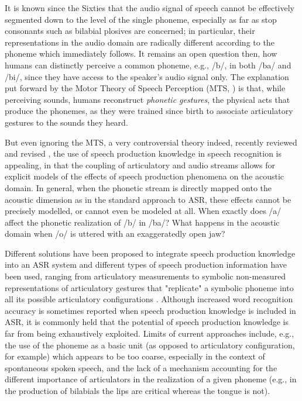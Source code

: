 It is known since the Sixties \cite{liberman1} that the audio signal of speech
cannot be effectively segmented down to the level of the single phoneme,
especially as far as stop consonants such as bilabial plosives
are concerned; in particular, their representations in the audio domain are
radically different according to the phoneme which immediately follows.
It remains an open question then, how humans can distinctly perceive a common
phoneme, e.g., /b/, in both /ba/ and /bi/, since they have access to the speaker's
audio signal only. The explanation put forward by the Motor Theory of Speech Perception
(MTS, \cite{liberman2}) is that, while perceiving sounds, humans reconstruct
\emph{phonetic gestures}, the physical acts that produce the phonemes, as they were
trained since birth to associate articulatory gestures to the sounds they heard.

But even ignoring the MTS, a very controversial theory indeed, recently reviewed and
revised \cite{galant,massaro}, the use of speech production knowledge in speech recognition
is appealing, in that the coupling of articulatory and audio streams allows for explicit models
of the effects of speech production phenomena on the acoustic domain.
In general, when the phonetic stream is directly mapped onto the acoustic dimension as in the standard
approach to ASR, these effects cannot be precisely modelled, or cannot even be modeled at all.
When exactly does /a/ affect the phonetic realization of /b/ in /ba/?
What happens in the acoustic domain when /o/ is uttered with an exaggeratedly open jaw?

Different solutions have been proposed to integrate speech production knowledge into an ASR system
and different types of speech production information have been used, ranging from articulatory
measurements \cite{zlokarnik,stephenson,wrench} to symbolic non-measured representations of
articulatory gestures that "replicate" a symbolic phoneme into all its possible articulatory
configurations \cite{richardson, livescu}.   
Although increased word recognition accuracy is sometimes reported when speech production
knowledge is included in ASR, it is commonly held that the potential of speech production
knowledge is far from being exhaustively exploited. Limits of current approaches include, e.g.,
the use of the phoneme as a basic unit (as opposed to articulatory configuration, for example)
which appears to be too coarse, especially in the context of spontaneous spoken speech,
and the lack of a mechanism accounting for the different importance of articulators in the
realization of a given phoneme (e.g., in the production of bilabials the lips are critical whereas
the tongue is not).

